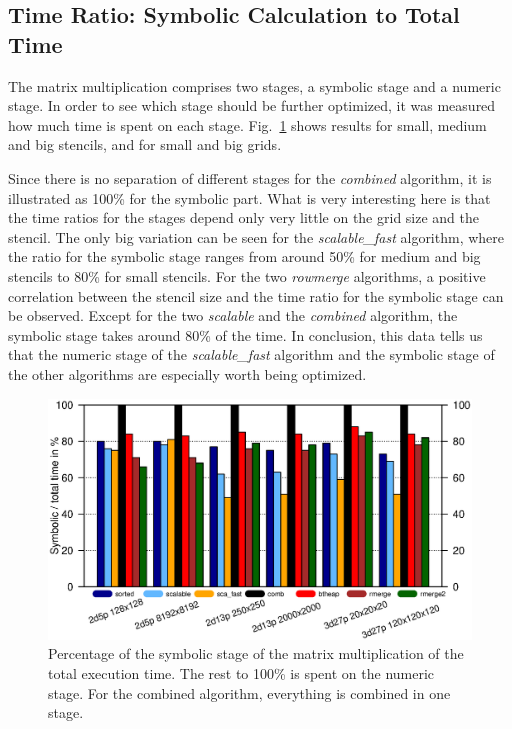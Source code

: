\subsection{Time Ratio: Symbolic Calculation to Total Time}
The matrix multiplication comprises two stages, a symbolic stage and a numeric stage. In order to see which stage should be further optimized, it was measured how much time is spent on each stage. Fig.~\ref{fig:seqsymnum} shows results for small, medium and big stencils, and for small and big grids. 

Since there is no separation of different stages for the \textit{combined} algorithm, it is illustrated as 100\% for the symbolic part. What is very interesting here is that the time ratios for the stages depend only very little on the grid size and the stencil. The only big variation can be seen for the \textit{scalable\_fast} algorithm, where the ratio for the symbolic stage ranges from around 50\% for medium and big stencils to 80\% for small stencils. For the two \textit{rowmerge} algorithms, a positive correlation between the stencil size and the time ratio for the symbolic stage can be observed. Except for the two \textit{scalable} and the \textit{combined} algorithm, the symbolic stage takes around 80\% of the time. In conclusion, this data tells us that the numeric stage of the \textit{scalable\_fast} algorithm and the symbolic stage of the other algorithms are especially worth being optimized.

\begin{figure}[tbp]
	\centering
	\includegraphics[width=1.05\textwidth, trim={0 2.cm 0 6cm},clip]{seq_symnum}
	\caption{Percentage of the symbolic stage of the matrix multiplication of the total execution time. The rest to 100\% is spent on the numeric stage. For the combined algorithm, everything is combined in one stage.} 
	\label{fig:seqsymnum}
\end{figure}


